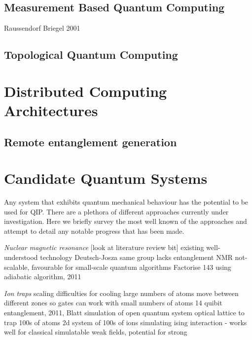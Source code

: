 \subsection{Measurement Based Quantum Computing}
\cite{one_way_qc} Raussendorf Briegel 2001

\subsection{Topological Quantum Computing}


\section{Distributed Computing Architectures}

\subsection{Remote entanglement generation}


\section{Candidate Quantum Systems}

Any system that exhibits quantum mechanical behaviour has the potential to be used for QIP. There are a plethora of different approaches currently under investigation. Here we briefly survey the most well known of the approaches and attempt to detail any notable progress that has been made.

\textit{Nuclear magnetic resonance}
[look at literature review bit]
existing well-understood technology
\cite{nmr_proposal_chuang_97}
\cite{chuang_first_nmr_realisation_98} Deutsch-Josza
\cite{nmr_factorise_15_01} same group
lacks entanglement \cite{nmr_pseudo_pure}
NMR not-scalable, favourable for small-scale quantum algorithms
\cite{nmr_143_factorization} Factorise 143 using adiabatic algorithm, 2011

\textit{Ion traps}
\cite{cirac_zoller_ion_trap_proposal_95}
\cite{first_ion_trap_wineland_98}
scaling difficulties for cooling large numbers of atoms
move between different zones so gates can work with small numbers of atoms
\cite{ion_trap_14_qubits} 14 quibit entanglement, 2011, Blatt
\cite{ion_trap_simulator} simulation of open quantum system
\cite{ion_trap_digital_simulator}
optical lattice to trap 100s of atoms
\cite{ion_trap_magnetism_simulator} 2d system of 100s of ions simulating ising interaction - works well for classical simulatable weak fields, potential for strong

